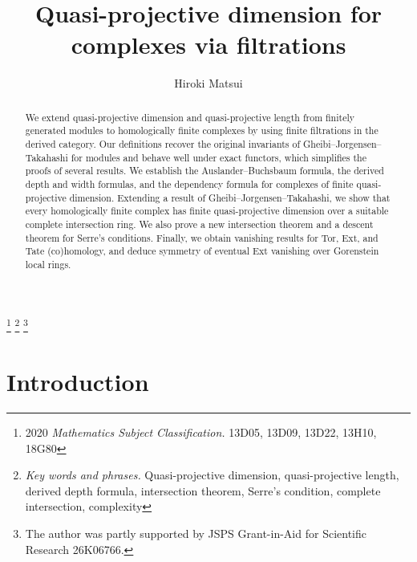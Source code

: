 \documentclass[10pt, a4paper,reqno]{amsart}
\theoremstyle{definition}
\theoremstyle{remark}
\numberwithin{equation}{thm}
\begin{document}
\title[Quasi-projective dimension for complexes via filtrations]{Quasi-projective dimension for complexes via filtrations}
\author{Hiroki Matsui}
\address{Department of Mathematics, Graduate School of Advanced Science and Engineering, Hiroshima University,
1-3-1 Kagamiyama, Higashi-Hiroshima, 739-8526, JAPAN}
\thanks{2020 {\em Mathematics Subject Classification.} 13D05, 13D09, 13D22, 13H10, 18G80}
\thanks{{\em Key words and phrases.} Quasi-projective dimension, quasi-projective length, derived depth formula,
intersection theorem, Serre's condition, complete intersection, complexity}
\thanks{The author was partly supported by JSPS Grant-in-Aid for Scientific Research 26K06766.}


\begin{abstract}
We extend quasi-projective dimension and quasi-projective length from finitely generated modules to homologically finite complexes by using finite filtrations in the derived category. 
Our definitions recover the original invariants of Gheibi--Jorgensen--Takahashi for modules and behave well under exact functors, which simplifies the proofs of several results. 
We establish the Auslander--Buchsbaum formula, the derived depth and width formulas, and the dependency formula for complexes of finite quasi-projective dimension. 
Extending a result of Gheibi--Jorgensen--Takahashi, we show that every homologically finite complex has finite quasi-projective dimension over a suitable complete intersection ring.
We also prove a new intersection theorem and a descent theorem for Serre's conditions. 
Finally, we obtain vanishing results for Tor, Ext, and Tate (co)homology, and deduce symmetry of eventual Ext vanishing over Gorenstein local rings.
\end{abstract}
\maketitle
\tableofcontents
\section{Introduction}
\end{document}
